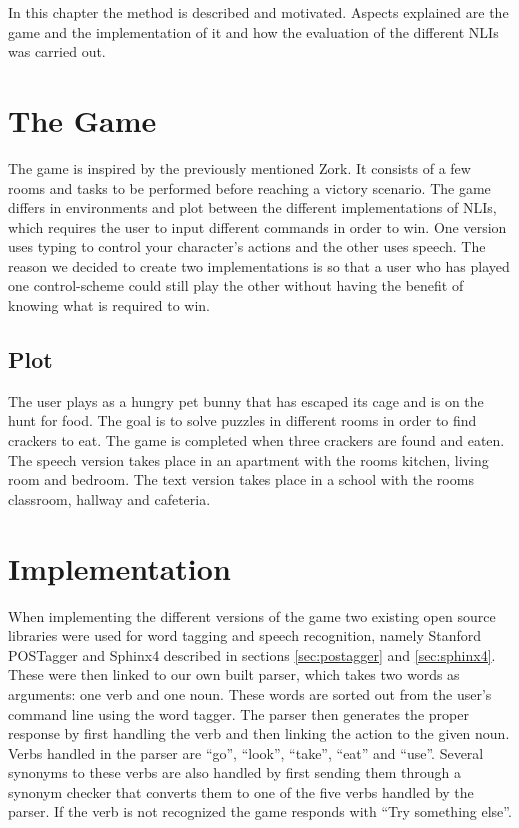 In this chapter the method is described and motivated. Aspects explained are the game and the implementation of it and how the evaluation of the different NLIs was carried out.

\section{The Game}
The game is inspired by the previously mentioned Zork. It consists of a few rooms and tasks to be performed before reaching a victory scenario. The game differs in environments and plot between the different implementations of NLIs, which requires the user to input different commands in order to win. One version uses typing to control your character’s actions and the other uses speech. The reason we decided to create two implementations is so that a user who has played one control-scheme could still play the other without having the benefit of knowing what is required to win.

\subsection{Plot}
The user plays as a hungry pet bunny that has escaped its cage and is on the hunt for food. The goal is to solve puzzles in different rooms in order to find crackers to eat. The game is completed when three crackers are found and eaten. The speech version takes place in an apartment with the rooms kitchen, living room and bedroom. The text version takes place in a school with the rooms classroom, hallway and cafeteria.

\section{Implementation}
When implementing the different versions of the game two existing open source libraries were used for word tagging and speech recognition, namely Stanford POSTagger and Sphinx4 described in sections \ref{sec:postagger} and \ref{sec:sphinx4}. These were then linked to our own built parser, which takes two words as arguments: one verb and one noun. These words are sorted out from the user's command line using the word tagger. The parser then generates the proper response by first handling the verb and then linking the action to the given noun. Verbs handled in the parser are ``go'', ``look'', ``take'', ``eat'' and ``use''. Several synonyms to these verbs are also handled by first sending them through a synonym checker that converts them to one of the five verbs handled by the parser. If the verb is not recognized the game responds with ``Try something else''.

